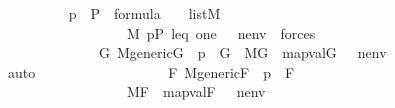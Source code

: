 \begin{isabellebody}
\ \ \ \ \ \ \ \ \isamarkupfalse%
\ {\isachardoublequoteopen}p\ {\isasymin}\ P\ {\isasymLongrightarrow}\ {\isacharquery}{\kern0pt}{\isasymchi}{\isasymin}formula\ {\isasymLongrightarrow}\ {\isacharbrackleft}{\kern0pt}{\isasymtheta}{\isacharcomma}{\kern0pt}{\isasympi}{\isacharbrackright}{\kern0pt}\ {\isasymin}\ list{\isacharparenleft}{\kern0pt}M{\isacharparenright}{\kern0pt}\ {\isasymLongrightarrow}\isanewline
\ \ \ \ \ \ \ \ \ \ \ \ \ \ \ \ \ \ M{\isacharcomma}{\kern0pt}\ {\isacharbrackleft}{\kern0pt}p{\isacharcomma}{\kern0pt}P{\isacharcomma}{\kern0pt}\ leq{\isacharcomma}{\kern0pt}\ one{\isacharbrackright}{\kern0pt}\ {\isacharat}{\kern0pt}\ {\isacharbrackleft}{\kern0pt}{\isasymtheta}{\isacharbrackright}{\kern0pt}{\isacharat}{\kern0pt}\ nenv{\isacharat}{\kern0pt}{\isacharbrackleft}{\kern0pt}{\isasympi}{\isacharbrackright}{\kern0pt}\ {\isasymTurnstile}\ forces{\isacharparenleft}{\kern0pt}{\isacharquery}{\kern0pt}{\isasymchi}{\isacharparenright}{\kern0pt}\ {\isasymLongrightarrow}\ \isanewline
\ \ \ \ \ \ \ \ \ \ \ \ \ \ {\isasymforall}G{\isachardot}{\kern0pt}\ M{\isacharunderscore}{\kern0pt}generic{\isacharparenleft}{\kern0pt}G{\isacharparenright}{\kern0pt}\ {\isasymand}\ p\ {\isasymin}\ G\ {\isasymlongrightarrow}\ M{\isacharbrackleft}{\kern0pt}G{\isacharbrackright}{\kern0pt}{\isacharcomma}{\kern0pt}\ \ map{\isacharparenleft}{\kern0pt}val{\isacharparenleft}{\kern0pt}G{\isacharparenright}{\kern0pt}{\isacharcomma}{\kern0pt}\ {\isacharbrackleft}{\kern0pt}{\isasymtheta}{\isacharbrackright}{\kern0pt}\ {\isacharat}{\kern0pt}\ nenv\ {\isacharat}{\kern0pt}{\isacharbrackleft}{\kern0pt}{\isasympi}{\isacharbrackright}{\kern0pt}{\isacharparenright}{\kern0pt}\ {\isasymTurnstile}\ \ {\isacharquery}{\kern0pt}{\isasymchi}{\isachardoublequoteclose}\isanewline
\ \ \ \ \ \ \ \ \ \ \isamarkupfalse%
\ auto\isanewline
\ \ \ \ \ \ \ \ \isamarkupfalse%
\isanewline
\ \ \ \ \ \ \ \ \isamarkupfalse%
\ {\isachardoublequoteopen}{\isasymforall}F{\isachardot}{\kern0pt}\ M{\isacharunderscore}{\kern0pt}generic{\isacharparenleft}{\kern0pt}F{\isacharparenright}{\kern0pt}\ {\isasymand}\ p\ {\isasymin}\ F\ {\isasymlongrightarrow}\ \isanewline
\ \ \ \ \ \ \ \ \ \ \ \ \ \ \ \ \ \ M{\isacharbrackleft}{\kern0pt}F{\isacharbrackright}{\kern0pt}{\isacharcomma}{\kern0pt}\ \ map{\isacharparenleft}{\kern0pt}val{\isacharparenleft}{\kern0pt}F{\isacharparenright}{\kern0pt}{\isacharcomma}{\kern0pt}\ {\isacharbrackleft}{\kern0pt}{\isasymtheta}{\isacharbrackright}{\kern0pt}\ {\isacharat}{\kern0pt}\ nenv\ {\isacharat}{\kern0pt}\ {\isacharbrackleft}{\kern0pt}{\isasympi}{\isacharbrackright}{\kern0pt}{\isacharparenright}{\kern0pt}\ {\isasymTurnstile}\ \ {\isacharquery}{\kern0pt}{\isasymchi}{\isachardoublequoteclose}\isanewline

\end{isabellebody}
